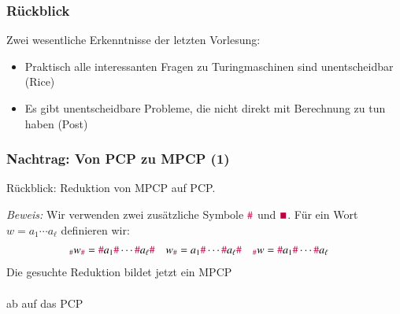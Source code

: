 \documentclass[aspectratio=1610,onlymath]{beamer}
\begin{document}
\maketitle

\begin{frame}\frametitle{Rückblick}

Zwei wesentliche Erkenntnisse der letzten Vorlesung:

\begin{itemize}
\item Praktisch alle interessanten Fragen zu Turingmaschinen sind unentscheidbar (Rice)
\item Es gibt unentscheidbare Probleme, die nicht direkt mit Berechnung zu tun haben (Post)
\end{itemize}

\end{frame}

\begin{frame}[t]\frametitle{Nachtrag: Von PCP zu MPCP (1)}

Rückblick: Reduktion von MPCP auf PCP.\bigskip


\pause\emph{Beweis:} Wir verwenden zwei zusätzliche Symbole $\mathtt{\textcolor{purple}{\#}}$ und 
$\mathtt{\textcolor{purple}{\blacksquare}}$. Für ein Wort $w=a_1\cdots a_\ell$
definieren wir:
\begin{align*}
{}_{\mathtt{\textcolor{purple}{\#}}}w_{\mathtt{\textcolor{purple}{\#}}} &= \mathtt{\textcolor{purple}{\#}}{a_1}\mathtt{\textcolor{purple}{\#}}\cdots\mathtt{\textcolor{purple}{\#}}{a_\ell}\mathtt{\textcolor{purple}{\#}} &
w_{\mathtt{\textcolor{purple}{\#}}} &= {a_1}\mathtt{\textcolor{purple}{\#}}\cdots\mathtt{\textcolor{purple}{\#}}{a_\ell}\mathtt{\textcolor{purple}{\#}} &
{}_{\mathtt{\textcolor{purple}{\#}}}w &= \mathtt{\textcolor{purple}{\#}}{a_1}\mathtt{\textcolor{purple}{\#}}\cdots\mathtt{\textcolor{purple}{\#}}{a_\ell}
\end{align*}
\pause Die gesuchte Reduktion bildet jetzt ein MPCP\\[1ex]
\narrowcentering{$\left[\begin{matrix}x_1\\y_1\end{matrix}\right]\quad\ldots\quad\left[\begin{matrix}x_k\\y_k\end{matrix}\right]$}\\[1ex]
ab auf das PCP\\[1ex]
\\[1ex]


\end{frame}
\end{document}

